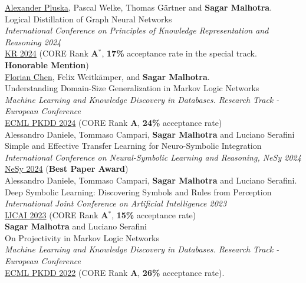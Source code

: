 \documentclass[10pt, a4paper]{article}
\newcommand{\years}[1]{\marginnote{\scriptsize #1}}
\begin{document}

\years{2024}\underline{Alexander Pluska}, Pascal Welke, Thomas G{\"a}rtner and \textbf{Sagar Malhotra}.\\
Logical Distillation of Graph Neural Networks\\
\emph{International Conference on Principles of Knowledge Representation and Reasoning 2024} \\
\href{https://arxiv.org/abs/2406.07126}{KR 2024} (CORE Rank \textbf{A$^{*}$}, \textbf{17\%} acceptance rate in the special track.  \textbf{Honorable Mention})\\

\years{2024}\underline{Florian Chen}, Felix Weitkämper, and \textbf{Sagar Malhotra}.\\
Understanding Domain-Size Generalization in Markov Logic Networks\\
\emph{Machine Learning and Knowledge Discovery in Databases. Research Track - European Conference} \\
\href{https://arxiv.org/abs/2403.15933}{ECML PKDD 2024} (CORE Rank \textbf{A}, \textbf{24\%} acceptance rate)\\

\years{2024}Alessandro Daniele, Tommaso Campari, \textbf{Sagar Malhotra} and Luciano Serafini\\
Simple and Effective Transfer Learning for Neuro-Symbolic Integration\\
\emph{International Conference on Neural-Symbolic Learning and Reasoning, NeSy 2024}\\
\href{https://arxiv.org/abs/2402.14047}{NeSy 2024} (\textbf{Best Paper Award})\\ 

\years{2023}Alessandro Daniele, Tommaso Campari, \textbf{Sagar Malhotra} and Luciano Serafini. \\ Deep Symbolic Learning: Discovering Symbols and Rules from Perception \\ 
\emph{International Joint Conference on Artificial Intelligence 2023}\\
\href{https://www.ijcai.org/proceedings/2023/400}{IJCAI 2023} (CORE Rank \textbf{A$^{*}$}, \textbf{15\%} acceptance rate)\\ 


\years{2022}\textbf{Sagar Malhotra} and Luciano Serafini\\
 On Projectivity in Markov Logic Networks \\ \emph{Machine Learning and Knowledge Discovery in Databases. Research Track - European Conference} \\  
\href{https://link.springer.com/chapter/10.1007/978-3-031-26419-1_14}{ECML PKDD 2022} (CORE Rank \textbf{A}, \textbf{26\%} acceptance rate).\\ 
\end{document}
